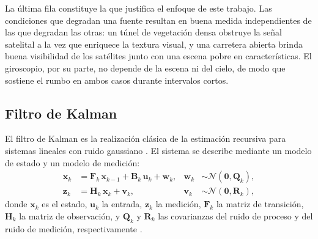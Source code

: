 La última fila constituye la que justifica el enfoque de este trabajo.
Las condiciones que degradan una fuente resultan en buena medida independientes de las que degradan las otras: un túnel de vegetación densa obstruye la señal satelital a la vez que enriquece la textura visual, y una carretera abierta brinda buena visibilidad de los satélites junto con una escena pobre en características.
El giroscopio, por su parte, no depende de la escena ni del cielo, de modo que sostiene el rumbo en ambos casos durante intervalos cortos.

\subsection{Filtro de Kalman}
\label{sec:fusion-clasicos}

El filtro de Kalman es la realización clásica de la estimación recursiva para sistemas lineales con ruido gaussiano \cite{kalman1960filtering}.
El sistema se describe mediante un modelo de estado y un modelo de medición:
\begin{equation}
\begin{aligned}
\mathbf{x}_k &= \mathbf{F}_k\,\mathbf{x}_{k-1} + \mathbf{B}_k\,\mathbf{u}_k + \mathbf{w}_k, & \mathbf{w}_k &\sim \mathcal{N}(\mathbf{0},\mathbf{Q}_k),\\
\mathbf{z}_k &= \mathbf{H}_k\,\mathbf{x}_k + \mathbf{v}_k, & \mathbf{v}_k &\sim \mathcal{N}(\mathbf{0},\mathbf{R}_k),
\end{aligned}
\label{eq:kf-modelo}
\end{equation}
donde $\mathbf{x}_k$ es el estado, $\mathbf{u}_k$ la entrada, $\mathbf{z}_k$ la medición, $\mathbf{F}_k$ la matriz de transición, $\mathbf{H}_k$ la matriz de observación, y $\mathbf{Q}_k$ y $\mathbf{R}_k$ las covarianzas del ruido de proceso y del ruido de medición, respectivamente \cite{groves2013gnss}.

